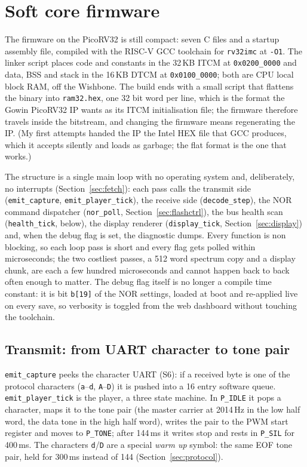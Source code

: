 \documentclass[a4paper,11pt]{article}
\begin{document}
\section{Soft core firmware}
\label{sec:firmware}

The firmware on the PicoRV32 is still compact: seven C files and a startup
assembly file, compiled with the RISC-V GCC toolchain for \texttt{rv32imc} at
\texttt{-O1}. The linker script places code and constants in the 32\,KB ITCM at
\texttt{0x0200\_0000} and data, BSS and stack in the 16\,KB DTCM at
\texttt{0x0100\_0000}; both are CPU local block RAM, off the Wishbone. The build
ends with a small script that flattens the binary into \texttt{ram32.hex}, one 32
bit word per line, which is the format the Gowin PicoRV32 IP wants as its ITCM
initialisation file; the firmware therefore travels inside the bitstream, and
changing the firmware means regenerating the IP. (My first attempts handed the IP
the Intel HEX file that GCC produces, which it accepts silently and loads as
garbage; the flat format is the one that works.)

The structure is a single main loop with no operating system and, deliberately, no
interrupts (Section~\ref{sec:fetch}): each pass calls the transmit side
(\texttt{emit\_capture}, \texttt{emit\_player\_tick}), the receive side
(\texttt{decode\_step}), the NOR command dispatcher (\texttt{nor\_poll},
Section~\ref{sec:flashctrl}), the bus health scan (\texttt{health\_tick}, below),
the display renderer (\texttt{display\_tick}, Section~\ref{sec:display}) and,
when the debug flag is set, the diagnostic dumps. Every function is non
blocking, so each loop pass is short and every flag gets polled within
microseconds; the two costliest passes, a 512 word spectrum copy and a display
chunk, are each a few hundred microseconds and cannot happen back to back often
enough to matter. The debug flag itself is no longer a compile time constant:
it is bit \texttt{b[19]} of the NOR settings, loaded at boot and re-applied
live on every save, so verbosity is toggled from the web dashboard without
touching the toolchain.

\subsection{Transmit: from UART character to tone pair}

\texttt{emit\_capture} peeks the character UART (S6): if a received byte is one of
the protocol characters (\texttt{a}--\texttt{d}, \texttt{A}--\texttt{D}) it is
pushed into a 16 entry software queue. \texttt{emit\_player\_tick} is the player,
a three state machine. In \texttt{P\_IDLE} it pops a character, maps it to the
tone pair (the master carrier at 2014\,Hz in the low half word, the data tone in
the high half word), writes the pair to the PWM start register and moves to
\texttt{P\_TONE}; after 144\,ms it writes stop and rests in \texttt{P\_SIL} for
400\,ms. The characters \texttt{d}/\texttt{D} are a special \emph{warm up} symbol:
the same EOF tone pair, held for 300\,ms instead of 144 (Section~\ref{sec:protocol}).
\end{document}
